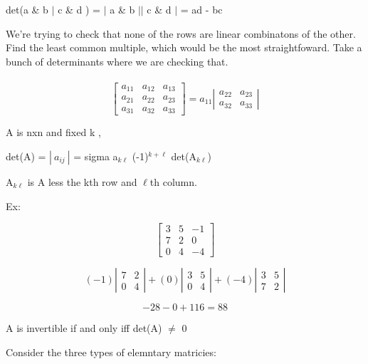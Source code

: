 

det(a \& b $|$ c \& d ) = $|$ a \& b $||$ c \& d $|$ = ad - bc


We're trying to check that none of the rows are linear combinatons of the other. Find the least common multiple, which would be the most straightfoward. Take a bunch of determinants where we are checking that.
\\ \\
\[ \left[ \begin{array}{lll} a_{11} & a_{12} & a_{13} \\
					  a_{21} & a_{22} & a_{23} \\
					  a_{31} & a_{32} & a_{33} 
	\end{array} \right] = a_{11} \left| \begin{array}{ll} a_{22} & a_{23} \\
								  a_{32} & a_{33} 
					\end{array}\right| \]


A is nxn and fixed k ,

det(A) = $|\ a_{ij}\ |$ = sigma a$_{k\ell}$ (-1)$^{k+\ell}$ det(A$_{k\ell}$)

A$_{k\ell}$ is A less the kth row and $\ell$th column.

Ex:

\[ \left[ \begin{array}{rrr} 3 & 5 & -1 \\ 7 & 2 & 0 \\ 0 & 4 & -4 \end{array} \right] \]

\[ (-1) \left| \begin{array}{ll} 7 & 2 \\ 0 & 4 \end{array} \right| + (0) \left| \begin{array}{ll} 3 & 5 \\ 0 & 4 \end{array} \right| + (-4) \left| \begin{array}{ll} 3 & 5 \\ 7 & 2 \end{array} \right| \]

\[ -28 - 0 + 116 = 88 \]

A is invertible if and only iff det(A) $\neq$ 0


Consider the three types of elemntary matricies:

